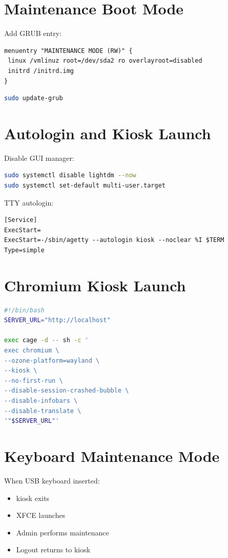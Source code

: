 \documentclass[11pt,letterpaper]{article}
\begin{document}
\section{Maintenance Boot Mode}

Add GRUB entry:

\begin{lstlisting}
menuentry "MAINTENANCE MODE (RW)" {
 linux /vmlinuz root=/dev/sda2 ro overlayroot=disabled
 initrd /initrd.img
}
\end{lstlisting}

\begin{lstlisting}[language=bash]
sudo update-grub
\end{lstlisting}

\section{Autologin and Kiosk Launch}

Disable GUI manager:

\begin{lstlisting}[language=bash]
sudo systemctl disable lightdm --now
sudo systemctl set-default multi-user.target
\end{lstlisting}

TTY autologin:

\begin{lstlisting}
[Service]
ExecStart=
ExecStart=-/sbin/agetty --autologin kiosk --noclear %I $TERM
Type=simple
\end{lstlisting}

\section{Chromium Kiosk Launch}

\begin{lstlisting}[language=bash]
#!/bin/bash
SERVER_URL="http://localhost"

exec cage -d -- sh -c '
exec chromium \
--ozone-platform=wayland \
--kiosk \
--no-first-run \
--disable-session-crashed-bubble \
--disable-infobars \
--disable-translate \
'"$SERVER_URL"'
\end{lstlisting}

\section{Keyboard Maintenance Mode}

When USB keyboard inserted:

\begin{itemize}
\item kiosk exits
\item XFCE launches
\item Admin performs maintenance
\item Logout returns to kiosk
\end{itemize}
\end{document}
